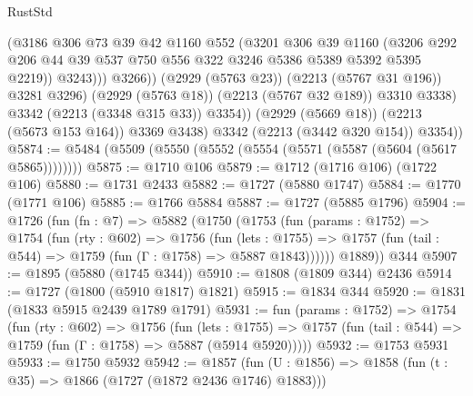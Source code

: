 \begin{lexlean}{RustStd}
\begin{coremodule}
                          (@3186
                            @306
                            @73
                            @39
                            @42
                            @1160
                            @552
                            (@3201
                              @306
                              @39
                              @1160
                              (@3206
                                @292
                                @206
                                @44
                                @39
                                @537
                                @750
                                @556
                                @322
                                @3246
                                @5386
                                @5389
                                @5392
                                @5395
                                @2219))
                            @3243)))
                      @3266))
                  (@2929 (@5763 @23))
                  (@2213 (@5767 @31 @196))
                  @3281
                  @3296)
                (@2929 (@5763 @18))
                (@2213 (@5767 @32 @189))
                @3310
                @3338)
              @3342
              (@2213 (@3348 @315 @33))
              @3354))
          (@2929 (@5669 @18))
          (@2213 (@5673 @153 @164))
          @3369
          @3438)
        @3342
        (@2213 (@3442 @320 @154))
        @3354))
@5874 := @5484 (@5509 (@5550 (@5552 (@5554 (@5571 (@5587 (@5604 (@5617 @5865))))))))
@5875 := @1710 @106
@5879 := @1712 (@1716 @106) (@1722 @106)
@5880 := @1731 @2433
@5882 := @1727 (@5880 @1747)
@5884 := @1770 (@1771 @106)
@5885 := @1766 @5884
@5887 := @1727 (@5885 @1796)
@5904 := @1726
    (fun (fn : @7) =>
    @5882
      (@1750
        (@1753
          (fun (params : @1752) =>
          @1754
            (fun (rty : @602) =>
            @1756
              (fun (lets : @1755) =>
              @1757 (fun (tail : @544) => @1759 (fun (Γ : @1758) => @5887 @1843))))))
        @1889))
    @344
@5907 := @1895 (@5880 (@1745 @344))
@5910 := @1808 (@1809 @344) @2436
@5914 := @1727 (@1800 (@5910 @1817) @1821)
@5915 := @1834 @344
@5920 := @1831 (@1833 @5915 @2439 @1789 @1791)
@5931 := fun (params : @1752) =>
  @1754
    (fun (rty : @602) =>
    @1756
      (fun (lets : @1755) =>
      @1757 (fun (tail : @544) => @1759 (fun (Γ : @1758) => @5887 (@5914 @5920)))))
@5932 := @1753 @5931
@5933 := @1750 @5932
@5942 := @1857 (fun (U : @1856) => @1858 (fun (t : @35) => @1866 (@1727 (@1872 @2436 @1746) @1883)))

\end{coremodule}
\end{lexlean}

